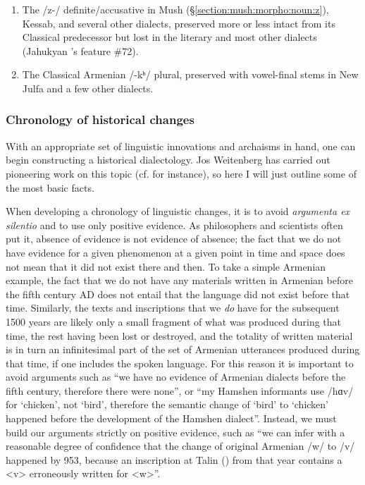 \documentclass[output=paper]{langscibook}
\begin{document}
\begin{enumerate}
\item 	The /z-/ definite/accusative in Mush (\S\ref{section:mush:morpho:noun:z}), Kessab, and several other dialects, preserved more or less intact from its Classical predecessor but lost in the literary and most other dialects (Jahukyan \citeyear{Jahukyan-1972-ArmenianDiaolectology}'s feature \#72).
\item The Classical Armenian /-kʰ/ plural, preserved with vowel-final stems in New Julfa and a few other dialects.
\end{enumerate}


\subsubsection{Chronology of historical changes}\label{sec:vaux:theory:diac:Chron}
With an appropriate set of linguistic innovations and archaisms in hand, one can begin constructing a historical dialectology. Jos Weitenberg has carried out pioneering work on this topic (cf. \citealt{Weitenberg-2001-ThoughtsearlyArmenianaccentuation} for instance), so here I will just outline some of the most basic facts.

When developing a chronology of linguistic changes, it is to avoid \textit{argumenta ex silentio} and to use only positive evidence. As philosophers and scientists often put it, absence of evidence is not evidence of absence; the fact that we do not have evidence for a given phenomenon at a given point in time and space does not mean that it did not exist there and then. To take a simple Armenian example, the fact that we do not have any materials written in Armenian before the fifth century AD does not entail that the language did not exist before that time. Similarly, the texts and inscriptions that we \textit{do} have for the subsequent 1500 years are likely only a small fragment of what was produced during that time, the rest having been lost or destroyed, and the totality of written material is in turn an infinitesimal part of the set of Armenian utterances produced during that time, if one includes the spoken language. For this reason it is important to avoid arguments such as ``we have no evidence of Armenian dialects before the fifth century, therefore there were none'', or ``my Hamshen informants use /hɑv/ for `chicken', not `bird', therefore the semantic change of `bird' to `chicken' happened before the development of the Hamshen dialect''. Instead, we must build our arguments strictly on positive evidence, such as ``we can infer with a reasonable degree of confidence that the change of original Armenian /w/ to /v/ happened by 953, because an inscription at Talin () from that year contains a <v> erroneously written for <w>''.
\end{document}
